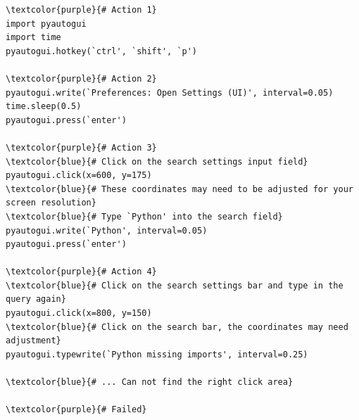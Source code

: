 \begin{tcolorbox}[title={Task w/ SoM: \textit{  turning off the code checking function of the python plugin in vscode}}]
    
\small
\begin{Verbatim}[commandchars=\\\{\}]
\textcolor{purple}{# Action 1}
import pyautogui
import time
pyautogui.hotkey(`ctrl', `shift', `p')

\textcolor{purple}{# Action 2}
pyautogui.write(`Preferences: Open Settings (UI)', interval=0.05)
time.sleep(0.5)
pyautogui.press(`enter')

\textcolor{purple}{# Action 3}
\textcolor{blue}{# Click on the search settings input field}
pyautogui.click(x=600, y=175)  
\textcolor{blue}{# These coordinates may need to be adjusted for your screen resolution}
\textcolor{blue}{# Type `Python' into the search field}
pyautogui.write(`Python', interval=0.05)
pyautogui.press(`enter')

\textcolor{purple}{# Action 4}
\textcolor{blue}{# Click on the search settings bar and type in the query again}
pyautogui.click(x=800, y=150)  
\textcolor{blue}{# Click on the search bar, the coordinates may need adjustment}
pyautogui.typewrite(`Python missing imports', interval=0.25)  

\textcolor{blue}{# ... Can not find the right click area}

\textcolor{purple}{# Failed}
\end{Verbatim}


\end{tcolorbox}










